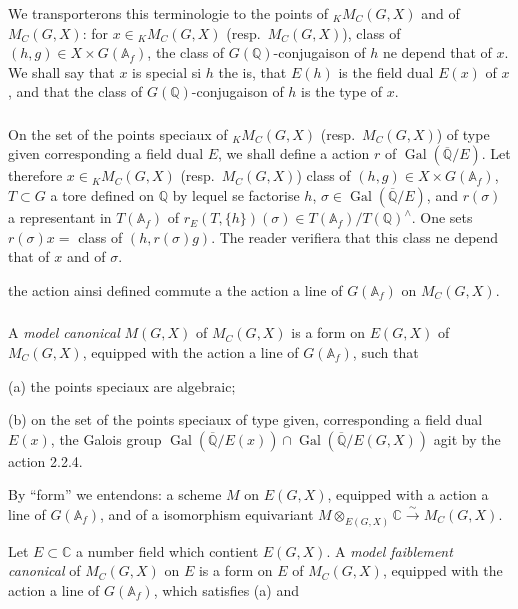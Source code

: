 \documentclass[12pt,a4paper]{article}
\theoremstyle{plain}
\theoremstyle{definition}
\theoremstyle{remark}
\DeclareMathOperator{\Gal}{Gal}
\newcommand{\QQ}{\mathbb{Q}}
\newcommand{\CC}{\mathbb{C}}
\newcommand{\Af}{\mathbb{A}_f}
\newcommand{\simto}{\xrightarrow{\sim}}
\begin{document}
We transporterons this terminologie to the points of ${}_K M_C(G,X)$ and of $M_C(G,X)$: for $x \in {}_K M_C(G,X)$ (resp.~$M_C(G,X)$), class of $(h,g) \in X \times G(\Af)$, the class of $G(\QQ)$-conjugaison of $h$ ne depend that of $x$. We shall say that $x$ is special si $h$ the is, that $E(h)$ is the field dual $E(x)$ of $x$, and that the class of $G(\QQ)$-conjugaison of $h$ is the type of $x$.

\subsubsection{}

On the set of the points speciaux of ${}_K M_C(G,X)$ (resp.~$M_C(G,X)$) of type given corresponding a field dual $E$, we shall define a action $r$ of $\Gal(\overline{\QQ}/E)$. Let therefore $x \in {}_K M_C(G,X)$ (resp.~$M_C(G,X)$) class of $(h,g) \in X \times G(\Af)$, $T \subset G$ a tore defined on $\QQ$ by lequel se factorise $h$, $\sigma \in \Gal(\overline{\QQ}/E)$, and $r(\sigma)$ a representant in $T(\Af)$ of $r_E(T,\{h\})(\sigma) \in T(\Af)/T(\QQ)^{\wedge}$. One sets $r(\sigma)x =$ class of $(h, r(\sigma)g)$. The reader verifiera that this class ne depend that of $x$ and of $\sigma$.

the action ainsi defined commute a the action a line of $G(\Af)$ on $M_C(G,X)$.

\subsubsection{}

A \textit{model canonical} $M(G,X)$ of $M_C(G,X)$ is a form on $E(G,X)$ of $M_C(G,X)$, equipped with the action a line of $G(\Af)$, such that

(a) the points speciaux are algebraic;

(b) on the set of the points speciaux of type given, corresponding a field dual $E(x)$, the Galois group $\Gal(\overline{\QQ}/E(x)) \cap \Gal(\overline{\QQ}/E(G,X))$ agit by the action 2.2.4.

By ``form'' we entendons: a scheme $M$ on $E(G,X)$, equipped with a action a line of $G(\Af)$, and of a isomorphism equivariant $M \otimes_{E(G,X)} \CC \simto M_C(G,X)$.

Let $E \subset \CC$ a number field which contient $E(G,X)$. A \textit{model faiblement canonical} of $M_C(G,X)$ on $E$ is a form on $E$ of $M_C(G,X)$, equipped with the action a line of $G(\Af)$, which satisfies (a) and
\end{document}
